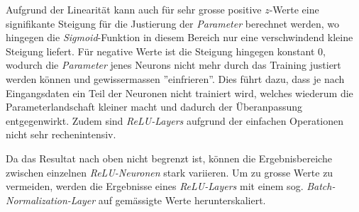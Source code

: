\begin{figure}[h]
	\centering
	\label{plt:rect_lin}
\end{figure}

Aufgrund der Linearität kann auch für sehr grosse positive $z$-Werte eine signifikante Steigung für die Justierung der \textit{Parameter} berechnet werden, wo hingegen die \textit{Sigmoid}-Funktion in diesem Bereich nur eine verschwindend kleine Steigung liefert. Für negative Werte ist die Steigung hingegen konstant 0, wodurch die \textit{Parameter} jenes Neurons nicht mehr durch das Training justiert werden können und gewissermassen ''einfrieren''. Dies führt dazu, dass je nach Eingangsdaten ein Teil der Neuronen nicht trainiert wird, welches wiederum die Parameterlandschaft kleiner macht und dadurch der Überanpassung entgegenwirkt. Zudem sind \textit{ReLU-Layers} aufgrund der einfachen Operationen nicht sehr rechenintensiv.

Da das Resultat nach oben nicht begrenzt ist, können die Ergebnisbereiche zwischen einzelnen \textit{ReLU-Neuronen} stark variieren. Um zu grosse Werte zu vermeiden, werden die Ergebnisse eines \textit{ReLU-Layers} mit einem sog. \textit{Batch-Normalization-Layer} auf gemässigte Werte herunterskaliert.

%
%

